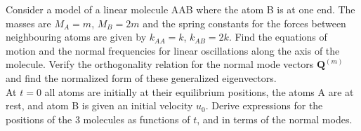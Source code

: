 \documentclass[a4paper]{article}
\begin{document}
\newpage
\begin{qns}
Consider a model of a linear molecule AAB where the atom B is at one end. The masses are $M_A=m$, $M_B=2m$ and the spring constants for the forces between neighbouring atoms are given by $k_{AA}=k$, $k_{AB}=2k$. Find the equations of motion and the normal frequencies for linear oscillations along the axis of the molecule. Verify the orthogonality relation for the normal mode vectors $\mathbf{Q}^{(m)}$ and find the normalized form of these generalized eigenvectors.\\[5pt]
At $t = 0$ all atoms are initially at their equilibrium positions, the atoms A are at rest, and atom B is given an initial velocity $u_0$. Derive expressions for the positions of the 3 molecules as functions of $t$, and in terms of the normal modes.
\end{qns}
\end{document}

